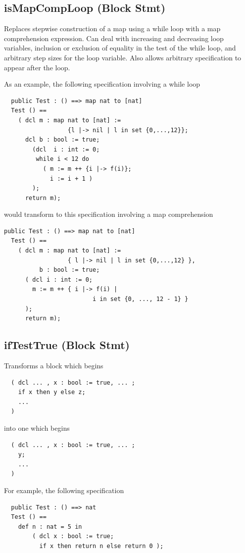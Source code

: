 \documentclass[\pformat,12pt]{article}
\begin{document}
\subsection{isMapCompLoop (Block Stmt)} 
  Replaces stepwise construction of a map using a while loop with a
  map comprehension expression. Can deal with increasing and
  decreasing loop variables, inclusion or exclusion of equality in the
  test of the while loop, and arbitrary step sizes for the loop
  variable. Also allows arbitrary specification to appear after the
  loop. 

As an example, the following specification involving a while loop

\begin{verbatim}
  public Test : () ==> map nat to [nat]
  Test () ==
    ( dcl m : map nat to [nat] := 
                  {l |-> nil | l in set {0,...,12}};
      dcl b : bool := true;
        (dcl  i : int := 0;
         while i < 12 do
           ( m := m ++ {i |-> f(i)};
             i := i + 1 )
        );
      return m);
\end{verbatim}

would transform to this specification involving a map comprehension

\begin{verbatim}
public Test : () ==> map nat to [nat]
  Test () ==
    ( dcl m : map nat to [nat] := 
                  { l |-> nil | l in set {0,...,12} },
          b : bool := true;
      ( dcl i : int := 0;
        m := m ++ { i |-> f(i) | 
                         i in set {0, ..., 12 - 1} }
      );
      return m);
\end{verbatim}


\subsection{ifTestTrue (Block Stmt)}
  Transforms a block which begins

\begin{verbatim}
  ( dcl ... , x : bool := true, ... ; 
    if x then y else z;
    ...
  )
\end{verbatim}

into one which begins

\begin{verbatim}
  ( dcl ... , x : bool := true, ... ; 
    y;
    ...
  )
\end{verbatim}

For example, the following specification

\begin{verbatim}
  public Test : () ==> nat  
  Test () ==
    def n : nat = 5 in
        ( dcl x : bool := true;
          if x then return n else return 0 );
\end{verbatim}
\end{document}

